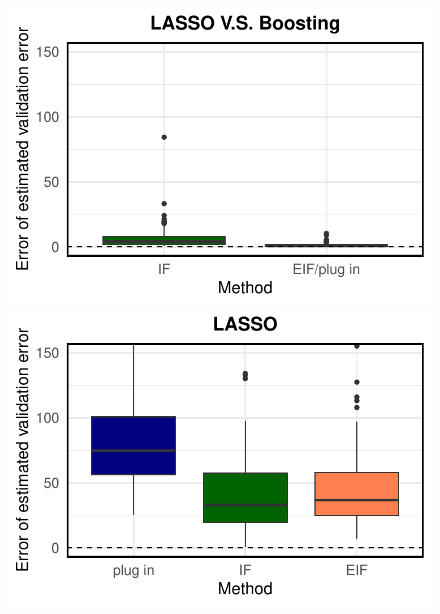 \begin{figure}[ht]
\begin{minipage}{0.3\textwidth}
                \includegraphics[clip, trim = 0cm 0cm 0cm 0cm, width = \textwidth]{plot/ACIC_linear_propensity_linear_HTE_estimator_error_LASSO_V.S._Boosting.pdf}
        \end{minipage}        
        \begin{minipage}{0.3\textwidth}
                \centering
                \includegraphics[clip, trim = 0cm 0cm 0cm 0cm, width = \textwidth]{plot/ACIC_linear_propensity_nonlinear_HTE_estimator_error_LASSO.pdf}
        \end{minipage}
        \begin{minipage}{0.3\textwidth}
                \centering

\end{minipage}
\end{figure}
